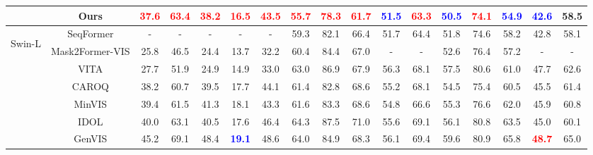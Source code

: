 \begin{table}[t!]
\begin{adjustbox}{max width = \textwidth}
\begin{tabular}{ccccccccccccccccc}
\multicolumn{1}{c|}{} & \multicolumn{1}{c|}{Ours} & \textbf{\textcolor{red}{37.6}} & \textbf{\textcolor{red}{63.4}}& \textbf{\textcolor{red}{38.2}}& \textbf{\textcolor{red}{16.5}}  & \multicolumn{1}{c|}{\textbf{\textcolor{red}{43.5}}} & \textbf{\textcolor{red}{55.7}} & \textbf{\textcolor{red}{78.3}}& \textbf{\textcolor{red}{61.7}}& \textbf{\textcolor{blue}{51.5}}  & \multicolumn{1}{c|}{\textbf{\textcolor{red}{63.3}}}& \textbf{\textcolor{blue}{50.5}} & \textbf{\textcolor{red}{74.1}}& \textbf{\textcolor{blue}{54.9}}& \textbf{\textcolor{blue}{42.6}}  & 58.5\\ \hline
\multicolumn{1}{c|}{\multirow{10}{*}{\begin{turn}{90}{Swin-L }\end{turn}}} & \multicolumn{1}{c|}{SeqFormer \citep{wu2022seqformer}} & - & -& -& -  & \multicolumn{1}{c|}{-} & 59.3 & 82.1& 66.4& 51.7  & \multicolumn{1}{c|}{64.4}& 51.8 & 74.6& 58.2& 42.8  & 58.1\\
\multicolumn{1}{c|}{} & \multicolumn{1}{c|}{Mask2Former-VIS \citep{cheng2021mask2former}} & 25.8 & 46.5& 24.4& 13.7  & \multicolumn{1}{c|}{32.2} & 60.4 & 84.4& 67.0& -  & \multicolumn{1}{c|}{-}& 52.6 & 76.4& 57.2& -  & -\\
\multicolumn{1}{c|}{} & \multicolumn{1}{c|}{VITA \citep{heo2022vita}} & 27.7 & 51.9& 24.9& 14.9  & \multicolumn{1}{c|}{33.0} & 63.0 & 86.9& 67.9& 56.3  & \multicolumn{1}{c|}{68.1}& 57.5 & 80.6& 61.0& 47.7  & 62.6\\
\multicolumn{1}{c|}{} & \multicolumn{1}{c|}{{CAROQ} \citep{Choudhuri_2023_CVPR}} & 38.2 & 60.7& 39.5& 17.7  & \multicolumn{1}{c|}{44.1} & 61.4 & 82.8& 68.6& 55.2  & \multicolumn{1}{c|}{68.1}& 54.5 & 75.4& 60.5& 45.5  & 61.4\\
\multicolumn{1}{c|}{} & \multicolumn{1}{c|}{MinVIS \citep{huang2022minvis}} & 39.4 & 61.5& 41.3& 18.1  & \multicolumn{1}{c|}{43.3} & 61.6 & 83.3& 68.6& 54.8  & \multicolumn{1}{c|}{66.6}& 55.3 & 76.6& 62.0& 45.9  & 60.8\\
\multicolumn{1}{c|}{} & \multicolumn{1}{c|}{IDOL \citep{wu2022defense}} & 40.0 & 63.1& 40.5& 17.6  & \multicolumn{1}{c|}{46.4} & 64.3 & 87.5& 71.0& 55.6  & \multicolumn{1}{c|}{69.1}& 56.1 & 80.8& 63.5& 45.0  & 60.1\\
\multicolumn{1}{c|}{} & \multicolumn{1}{c|}{GenVIS \citep{heo2023generalized}} & 45.2 & 69.1& 48.4& \textbf{\textcolor{blue}{19.1}}  & \multicolumn{1}{c|}{48.6}  & 64.0 & 84.9& 68.3& 56.1  & \multicolumn{1}{c|}{69.4}& 59.6 & 80.9& 65.8& \textbf{\textcolor{red}{48.7}}  & 65.0\\

\end{tabular}
\end{adjustbox}
\end{table}

